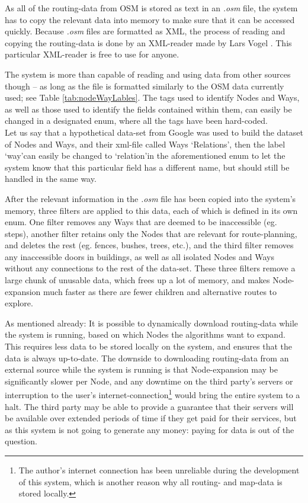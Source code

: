 As all of the routing-data from OSM is stored as text in an \textit{.osm} file, the system has to copy the relevant data into memory to make sure that it can be accessed quickly. Because \textit{.osm} files are formatted as XML, the process of reading and copying the routing-data is done by an XML-reader made by Lars Vogel \cite{Vogella-XML}. This particular XML-reader is free to use for anyone.

The system is more than capable of reading and using data from other sources though -- as long as the file is formatted similarly to the OSM data currently used; see Table \ref{tab:nodeWayLables}. The tags used to identify Nodes and Ways, as well as those used to identify the fields contained within them, can easily be changed in a designated enum, where all the tags have been hard-coded.\\
Let us say that a hypothetical data-set from Google was used to build the dataset of Nodes and Ways, and their xml-file called Ways \textquoteleft Relations\textquoteright, then the label \textquoteleft way\textquoteright can easily be changed to \textquoteleft relation\textquoteright in the aforementioned enum to let the system know that this particular field has a different name, but should still be handled in the same way.

After the relevant information in the \textit{.osm} file has been copied into the system's memory, three filters are applied to this data, each of which is defined in its own enum. One filter removes any Ways that are deemed to be inaccessible (eg. steps), another filter retains only the Nodes that are relevant for route-planning, and deletes the rest (eg. fences, bushes, trees, etc.), and the third filter removes any inaccessible doors in buildings, as well as all isolated Nodes and Ways without any connections to the rest of the data-set. These three filters remove a large chunk of unusable data, which frees up a lot of memory, and makes Node-expansion much faster as there are fewer children and alternative routes to explore.

As mentioned already: It is possible to dynamically download routing-data while the system is running, based on which Nodes the algorithms want to expand. This requires less data to be stored locally on the system, and ensures that the data is always up-to-date. The downside to downloading routing-data from an external source while the system is running is that Node-expansion may be significantly slower per Node, and any downtime on the third party's servers or interruption to the user's internet-connection\footnote{The author's internet connection has been unreliable during the development of this system, which is another reason why all routing- and map-data is stored locally.} would bring the entire system to a halt. The third party may be able to provide a guarantee that their servers will be available over extended periods of time if they get paid for their services, but as this system is not going to generate any money: paying for data is out of the question.

